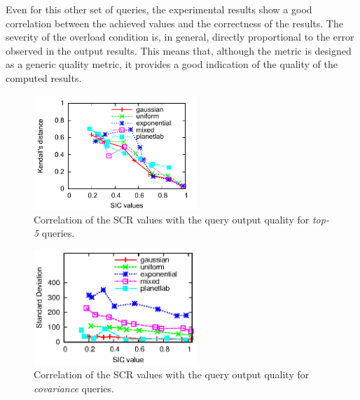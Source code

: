 Even for this other set of queries, the experimental results show a good correlation between the achieved
\sic values and the correctness of the results. The severity of the overload condition is, in general,
directly proportional to the error observed in the output results. This means that, although the \sic
metric is designed as a generic quality metric, it provides a good indication of the quality of the
computed results.
\begin{figure}[h!]
\centering 
\includegraphics[width=0.55\textwidth]{img/tesi/topK-distance}
\caption{Correlation of the SCR values with the query output quality for \emph{top-5} queries.}
\label{fig:top5}
\end{figure}
\clearpage
\begin{figure}[h!]
\centering
\includegraphics[width=0.55\textwidth]{img/tesi/cov}
\caption{Correlation of the SCR values with the query output quality for \emph{covariance} queries.}
\label{fig:cov}
\end{figure}%

